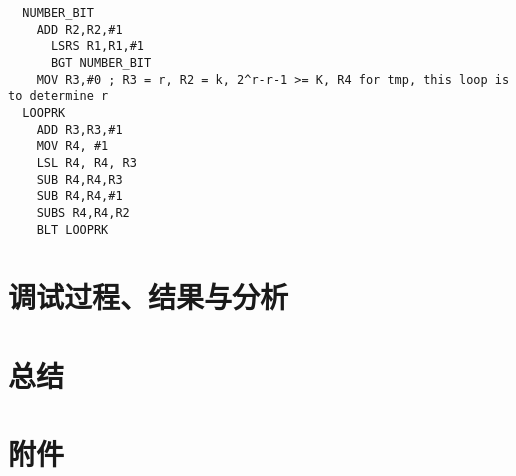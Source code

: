 \documentclass[a4paper,10pt,UTF8]{paper}
\numberwithin{equation}{section}
\numberwithin{figure}{section}
\begin{document}
\begin{verbatim}
  NUMBER_BIT
    ADD R2,R2,#1
      LSRS R1,R1,#1
      BGT NUMBER_BIT
    MOV R3,#0 ; R3 = r, R2 = k, 2^r-r-1 >= K, R4 for tmp, this loop is to determine r
  LOOPRK
    ADD R3,R3,#1
    MOV R4, #1
    LSL R4, R4, R3
    SUB R4,R4,R3
    SUB R4,R4,#1
    SUBS R4,R4,R2
    BLT LOOPRK
\end{verbatim}


\section{调试过程、结果与分析}

\section{总结}

\section{附件}
\end{document}
